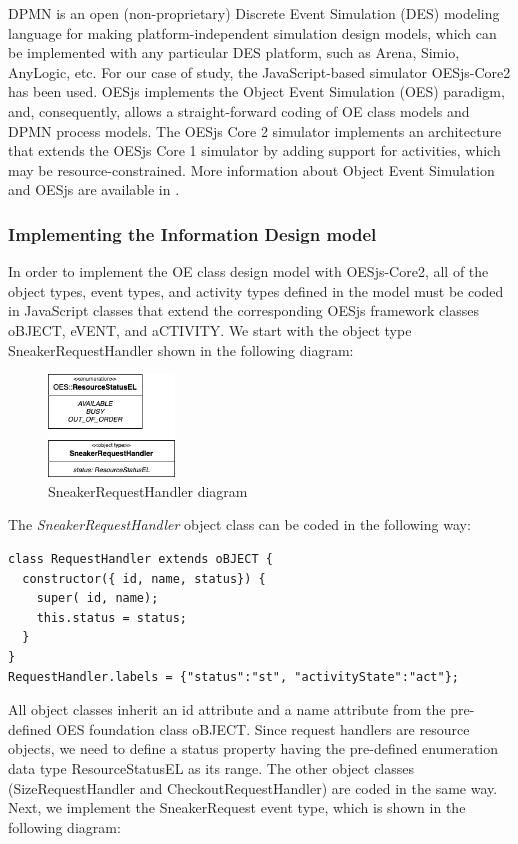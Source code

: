 \documentclass{article}
\begin{document}
DPMN is an open (non-proprietary) Discrete Event Simulation (DES) modeling language for making platform-independent simulation design models, which can be implemented with any particular DES platform, such as Arena, Simio, AnyLogic, etc. For our case of study, the JavaScript-based simulator OESjs-Core2 has been used. OESjs implements the Object Event Simulation (OES) paradigm, and, consequently, allows a straight-forward coding of OE class models and DPMN process models. The OESjs Core 2 simulator implements an architecture that extends the OESjs Core 1 simulator by adding support for activities, which may be resource-constrained. More information about Object Event Simulation and OESjs are available in \cite{Wagner_OESjs}. 

\subsubsection{Implementing the Information Design model}
In order to implement the OE class design model with OESjs-Core2, all of the object types, event types, and activity types defined in the model must be coded in JavaScript classes that extend the corresponding OESjs framework classes oBJECT, eVENT, and aCTIVITY. We start with the object type SneakerRequestHandler shown in the following diagram:

\begin{figure}[h]
    \centering
    \includegraphics[width=0.3\textwidth]{SneakerRequestHandler}
    \caption{SneakerRequestHandler diagram}
\end{figure} 

\FloatBarrier 

The {\em SneakerRequestHandler} object class can be coded in the following way:

\medskip
\begin{lstlisting}[caption=SneakerRequestHandler]
class RequestHandler extends oBJECT {
  constructor({ id, name, status}) {
    super( id, name);
    this.status = status;
  }
}
RequestHandler.labels = {"status":"st", "activityState":"act"};
\end{lstlisting}

All object classes inherit an id attribute and a name attribute from the pre-defined OES foundation class oBJECT. Since request handlers are resource objects, we need to define a status property having the pre-defined enumeration data type ResourceStatusEL as its range.
The other object classes (SizeRequestHandler and CheckoutRequestHandler) are coded in the same way. \\
Next, we implement the SneakerRequest event type, which is shown in the following diagram:
\end{document}
